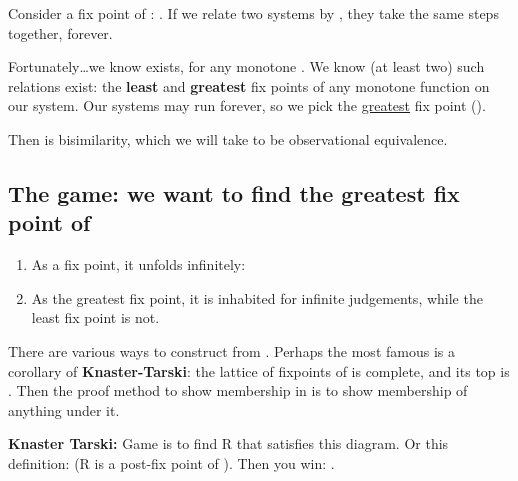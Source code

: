 Consider a fix point of : . If we relate two
systems by , they take the same  steps together, forever.

Fortunately\ldots we know  exists, for any monotone . We
know (at least two) such relations exist: the \textbf{least} and \textbf{greatest}
fix points of any monotone function on our system. Our systems may run forever,
so we pick the \underline{greatest} fix point ().

Then  is bisimilarity, which we will take to be observational
equivalence.

\subsection{The game: we want to find the greatest fix point of }

\begin{enumerate}
  \item As a fix point, it unfolds infinitely:
  \item As the greatest fix point, it is inhabited for infinite judgements,
        while the least fix point is not.
\end{enumerate}

There are various ways to construct  from . Perhaps the most
famous is a corollary of \textbf{Knaster-Tarski}: the lattice of fixpoints of
 is complete, and its top is . Then the proof method to show
membership in  is to show membership of anything under it.

\textbf{Knaster Tarski:} Game is to find R that satisfies this diagram. Or this
definition:  (R is a post-fix point of ). Then you win:
.

